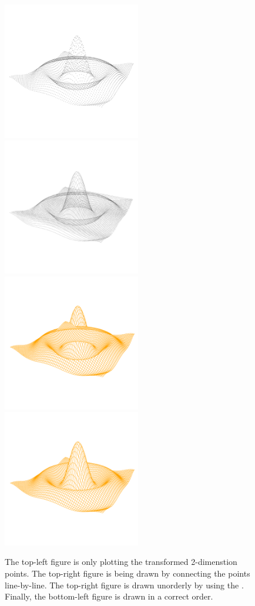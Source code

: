\documentclass[paper=a4, fontsize=11pt]{report}
\begin{document}
\begin{figure}[h]
  \includegraphics[height = 6cm, width = 6cm]{figure/standalone_p_1.pdf}
  \includegraphics[height = 6cm, width = 6cm]{figure/standalone_p_2.pdf}
  \includegraphics[height = 6cm, width = 6cm]{figure/standalone_p_3.pdf}
  \includegraphics[height = 6cm, width = 6cm]{figure/standalone_p_4.pdf}
  \caption{The top-left figure is only plotting the transformed 2-dimenstion points. The top-right figure is being drawn by connecting the points line-by-line. The top-right figure is drawn unorderly by using the . Finally, the bottom-left figure is drawn in a correct order.}
  	\label{figure4}
\end{figure}
\end{document}

